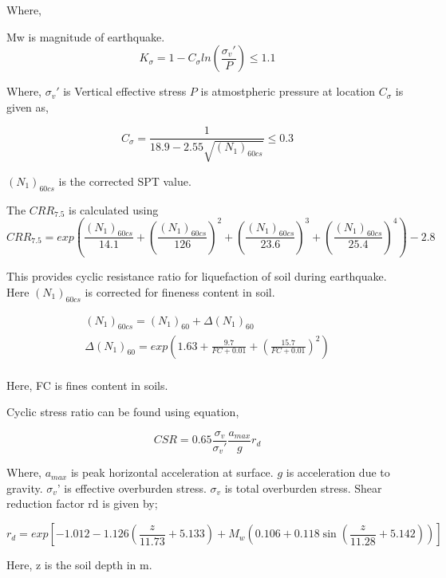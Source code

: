 Where,

Mw is magnitude of earthquake.
\begin{equation}
K_\sigma = 1 - C_\sigma ln (\frac{\sigma_v'}{P}) \leq 1.1
\end{equation}

Where,
$\sigma_v'$ is Vertical effective stress
$P$ is atmostpheric pressure at location
$C_\sigma$ is given as,

\begin{equation}
C_\sigma = \frac{1}{18.9-2.55\sqrt{({N_1})_{60cs}}} \leq 0.3
\end{equation}

$({N_1})_{60cs}$ is the corrected SPT value.

The $CRR_{7.5}$ is calculated using \cite{idris_and_bolinger}
\begin{equation}
CRR_{7.5} = exp(\frac{({N_1})_{60cs}}{14.1} + (\frac{({N_1})_{60cs}}{126})^2 + (\frac{({N_1})_{60cs}}{23.6})^3 + (\frac{({N_1})_{60cs}}{25.4})^4) - 2.8
\end{equation}

This provides cyclic resistance ratio for liquefaction of soil during earthquake. Here $({N_1})_{60cs}$ is corrected for fineness content in soil.

\begin{gather}
({N_1})_{60cs} = ({N_1})_{60} + \Delta({N_1})_{60} \\
\Delta({N_1})_{60} = exp(1.63 + \frac{9.7}{FC+0.01} + (\frac{15.7}{FC+0.01})^2 ) \\
\end{gather}

Here, FC is fines content in soils.

Cyclic stress ratio can be found using equation,

\begin{equation}
CSR = 0.65 \frac{\sigma_v}{\sigma_v'} \frac{a_{max}}{g} r_d
\end{equation}

Where,
$a_{max}$ is peak horizontal acceleration at surface.
$g$ is acceleration due to gravity.
$\sigma_v’$ is effective overburden stress.
$\sigma_v$ is total overburden stress.
Shear reduction factor rd is given by;

\begin{equation}
r_d = exp[ -1.012 - 1.126 (\frac{z}{11.73} + 5.133) + M_w( 0.106 + 0.118 \sin ( \frac{z}{11.28} +5.142 ) ) ]
\end{equation}

Here, z is the soil depth in m.

